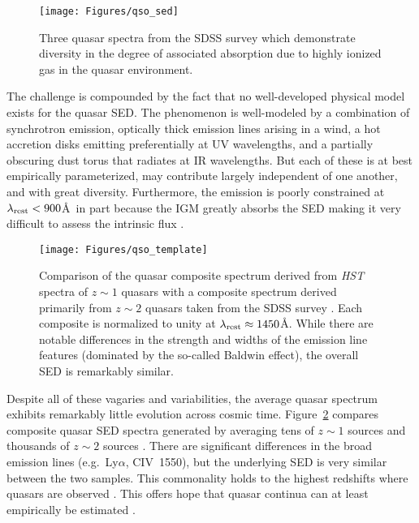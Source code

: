 \documentclass[graybox]{svmult}
\def\lya{Ly$\alpha$}
\begin{document}
%
\begin{figure}[b]
\sidecaption
\texttt{[image: Figures/qso\_sed]}
%
%
\caption{Three quasar spectra from the SDSS survey
which demonstrate diversity in the degree of associated
absorption due to highly ionized gas in the quasar
environment.
}
\label{fig:qso_SED}       %
\end{figure}

The challenge is compounded by the fact that no well-developed physical
model exists for the quasar SED.  The phenomenon is well-modeled
by a combination of synchrotron emission, optically thick
emission lines arising in a wind, a hot accretion disks 
emitting preferentially at UV wavelengths, and a partially
obscuring dust torus that radiates at IR wavelengths.
But each of these is at best empirically parameterized, may
contribute largely independent of one another, and 
with great diversity.  Furthermore, the emission is
poorly constrained at $\lambda_{\rm rest} < 900$\AA\
in part because the IGM greatly absorbs the SED
making it very difficult to assess the intrinsic flux 
\cite[see][]{lusso+15}.

%
\begin{figure}[b]
\sidecaption
\texttt{[image: Figures/qso\_template]}
%
%
\caption{Comparison of the quasar composite spectrum derived
from {\it HST} spectra of $z \sim 1$ quasars 
\cite{telfer02} with a composite spectrum derived
primarily from $z \sim 2$ quasars taken from the SDSS survey
\cite{vanden01}.  Each composite is normalized to unity
at $\lambda_{\rm rest} \approx 1450$\AA.
While there are notable differences in the
strength and widths of the emission line features (dominated
by the so-called Baldwin effect), the overall SED is remarkably
similar.  
}
\label{fig:qso_template}       %
\end{figure}



Despite all of these vagaries and variabilities, the average
quasar spectrum exhibits remarkably little evolution across
cosmic time.  Figure~\ref{fig:qso_template}
compares composite quasar SED spectra generated by
averaging tens of $z \sim 1$ sources \cite{telfer02}
and thousands of $z \sim 2$ sources \cite{vanden01}.
There are significant differences in the broad emission
lines (e.g.\ \lya, CIV~1550), but the underlying
SED is very similar between the two samples.  This commonality
holds to the highest redshifts where quasars are
observed \cite[Figure~\ref{fig:becker13_fig2}][]{becker+13}.
This offers hope that quasar continua can at least
empirically be estimated \cite{new_paper_by_AZ_guy}.
\end{document}
